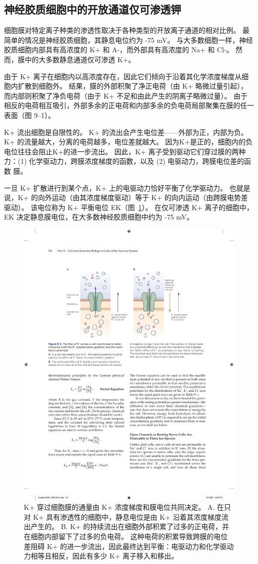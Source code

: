 \subsection{神经胶质细胞中的开放通道仅可渗透钾}

细胞膜对特定离子种类的渗透性取决于各种类型的开放离子通道的相对比例。
最简单的情况是神经胶质细胞，其静息电位约为 -75 mV。
与大多数细胞一样，神经胶质细胞内部具有高浓度的 K+ 和 A-，而外部具有高浓度的 Na+ 和 Cl-。
然而，膜中的大多数静息通道仅可渗透 K+。


由于 K+ 离子在细胞内以高浓度存在，因此它们倾向于沿着其化学浓度梯度从细胞内扩散到细胞外。
结果，膜的外部积聚了净正电荷（由 K+ 略微过量引起），而内部则积聚了净负电荷（由于 K+ 不足和由此产生的阴离子略微过量）。
由于相反的电荷相互吸引，外部多余的正电荷和内部多余的负电荷局部聚集在膜的任一表面（图 9–1）。


K+ 流出细胞是自限性的。
K+ 的流出会产生电位差——外部为正，内部为负。
K+ 的流量越大，分离的电荷越多，电位差就越大。
因为K+是正的，细胞内的负电位往往会阻止K+的进一步流出。
因此，K+ 离子受到驱动它们穿过膜的两种力：(1) 化学驱动力，跨膜浓度梯度的函数，以及 (2) 电驱动力，跨膜电位差的函数 膜。


一旦 K+ 扩散进行到某个点，K+ 上的电驱动力恰好平衡了化学驱动力。
也就是说，K+ 的向外运动（由其浓度梯度驱动）等于 K+ 的向内运动（由跨膜电势差驱动）。
该电位称为 K+ 平衡电位 EK（图~\ref{fig:9_3}）。
在仅可渗透 K+ 离子的细胞中，EK 决定静息膜电位，在大多数神经胶质细胞中约为 -75 mV。


\begin{figure}[htbp]
	\centering
	\includegraphics[width=0.7\linewidth]{chap09/fig_9_3}
	\caption{K+ 穿过细胞膜的通量由 K+ 浓度梯度和膜电位共同决定。 A. 在只对 K+ 具有渗透性的细胞中，静息电位是由 K+ 沿着其浓度梯度流出产生的。 B. K+ 的持续流出在细胞外部积累了过多的正电荷，并在细胞内部留下了过多的负电荷。 这种电荷的积累导致跨膜的电位差阻碍 K+ 的进一步流出，因此最终达到平衡：电驱动力和化学驱动力相等且相反，因此有多少 K+ 离子移入和移出。}
	\label{fig:9_3}
\end{figure}


